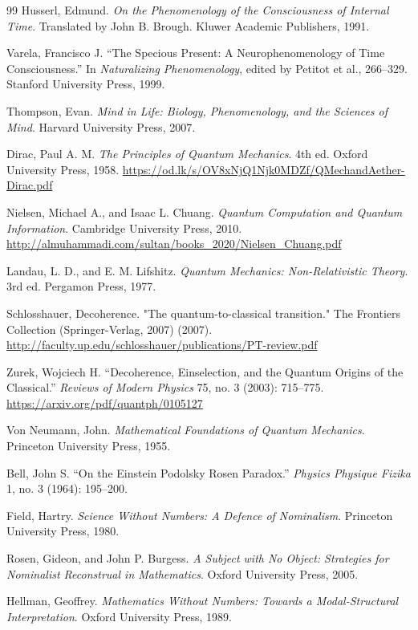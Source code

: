 \documentclass[11pt]{article}
\numberwithin{equation}{section} %
\begin{document}
\begin{thebibliography}{99}
Husserl, Edmund. \textit{On the Phenomenology of the Consciousness of Internal Time}. Translated by John B. Brough. Kluwer Academic Publishers, 1991.

Varela, Francisco J. “The Specious Present: A Neurophenomenology of Time Consciousness.” In \textit{Naturalizing Phenomenology}, edited by Petitot et al., 266–329. Stanford University Press, 1999.

Thompson, Evan. \textit{Mind in Life: Biology, Phenomenology, and the Sciences of Mind}. Harvard University Press, 2007.

Dirac, Paul A. M. \textit{The Principles of Quantum Mechanics}. 4th ed. Oxford University Press, 1958. \url{https://od.lk/s/OV8xNjQ1Njk0MDZf/QMechandAether-Dirac.pdf}

Nielsen, Michael A., and Isaac L. Chuang. \textit{Quantum Computation and Quantum Information}. Cambridge University Press, 2010. \url{http://almuhammadi.com/sultan/books_2020/Nielsen_Chuang.pdf}

Landau, L. D., and E. M. Lifshitz. \textit{Quantum Mechanics: Non-Relativistic Theory}. 3rd ed. Pergamon Press, 1977.

Schlosshauer, Decoherence. "The quantum-to-classical transition." The Frontiers Collection (Springer-Verlag, 2007) (2007). \url{http://faculty.up.edu/schlosshauer/publications/PT-review.pdf}

Zurek, Wojciech H. “Decoherence, Einselection, and the Quantum Origins of the Classical.” \textit{Reviews of Modern Physics} 75, no. 3 (2003): 715–775. \url{https://arxiv.org/pdf/quantph/0105127}

Von Neumann, John. \textit{Mathematical Foundations of Quantum Mechanics}. Princeton University Press, 1955.

Bell, John S. “On the Einstein Podolsky Rosen Paradox.” \textit{Physics Physique Fizika} 1, no. 3 (1964): 195–200.

Field, Hartry. \textit{Science Without Numbers: A Defence of Nominalism}. Princeton University Press, 1980.

Rosen, Gideon, and John P. Burgess. \textit{A Subject with No Object: Strategies for Nominalist Reconstrual in Mathematics}. Oxford University Press, 2005.

Hellman, Geoffrey. \textit{Mathematics Without Numbers: Towards a Modal-Structural Interpretation}. Oxford University Press, 1989.


\end{thebibliography}
\end{document}
